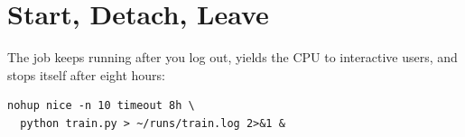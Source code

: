 \section{Start, Detach, Leave}

 The job keeps running after you log out, yields the
CPU to interactive users, and stops itself after eight hours:
\begin{verbatim}
nohup nice -n 10 timeout 8h \
  python train.py > ~/runs/train.log 2>&1 &
\end{verbatim}
